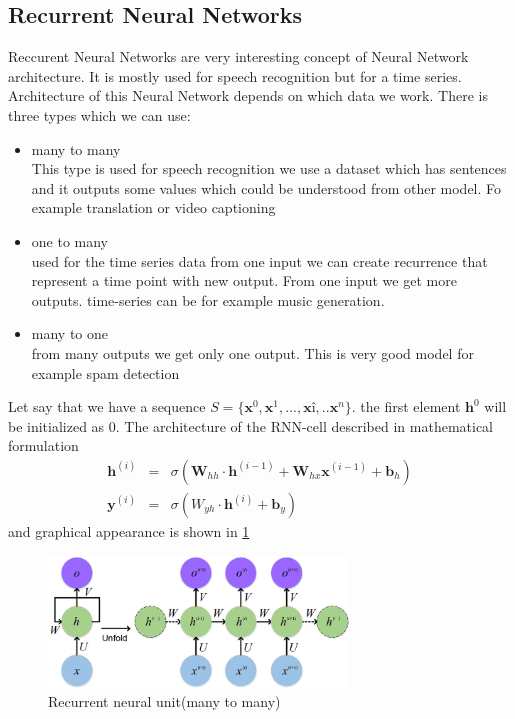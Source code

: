 \subsection{Recurrent Neural Networks}
Reccurent Neural Networks are very interesting concept of Neural Network architecture. It is mostly used for speech recognition but for a time series\cite{mlprnn}.\\
Architecture of this Neural Network depends on which data we work.
There is three types which we can use\cite{rnntypes}:
\begin{itemize}
	\item many to many\\
	This type is used for speech recognition we use a dataset which has sentences and it outputs some values which could be understood from other model. Fo example translation or video captioning
	\item one to many\\
	used for the time series data from one input we can create recurrence that represent a time point with new output. From one input we get more outputs. time-series can be for example music generation.
	\item many to one\\
	from many outputs we get only one output. This is very good model for example spam detection
\end{itemize}
Let say that we have a sequence $S = \{\mathbf{x}^0,\mathbf{x}^1,...,\mathbf{x}î,..\mathbf{x}^n\}$. the first element $\mathbf{h}^0$ will be initialized as 0.
The architecture of the RNN-cell\cite{rnn} described in mathematical formulation 
\begin{eqnarray*}
	\mathbf{h}^{(i)} &=& \sigma(\mathbf{W}_{hh} \cdot \mathbf{h}^{(i-1)} + \mathbf{W}_{hx}\mathbf{x}^{(i-1)} + \mathbf{b}_h)\\
	\mathbf{y}^{(i)} &=& \sigma(W_{yh}\cdot \mathbf{h}^{(i)} + \mathbf{b}_y)
\end{eqnarray*} and graphical appearance is shown in \ref{rnn}
\begin{figure}[h!]
	\centering\includegraphics[width=8cm]{chapters/chapter2/rnn}
	\caption{Recurrent neural unit(many to many)\cite{rnn_picture}}
	\label{rnn}
\end{figure}

